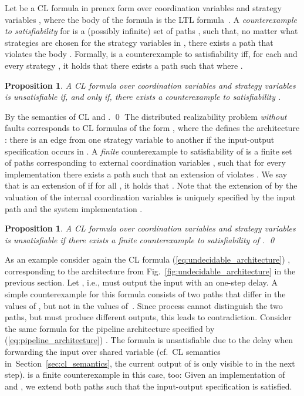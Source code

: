 \documentclass{LMCS}
\theoremstyle{plain}\newtheorem{theorem}[thm]{Theorem}
\theoremstyle{plain}\newtheorem{lemma}[thm]{Lemma}
\theoremstyle{plain}\newtheorem{proposition}[thm]{Proposition}
\theoremstyle{plain}\newtheorem{corollary}[thm]{Corollary}
\theoremstyle{definition}\newtheorem{definition}{Definition}[section]
\begin{document}
Let  be a CL formula in prenex form over coordination variables  and strategy variables , where the body of the formula is the LTL formula~.
A \emph{counterexample to satisfiability} for  is a (possibly infinite) set of paths , such that, no matter what strategies are chosen for the strategy variables in , there exists a path  that violates the body .
Formally,  is a counterexample to satisfiability iff, for each  and every strategy , it holds that there exists a path  such that  where .
\begin{proposition} \label{eq:ecl_unsatisfiability}
A CL formula  over coordination variables  and strategy variables 
is unsatisfiable if, and only if, there exists a counterexample to satisfiability .
\end{proposition}
\proof
  By the semantics of CL and .
\qed\noindent
The distributed realizability problem \emph{without} faults corresponds to CL formulas of the form , where the  defines the architecture : there is an edge from one strategy variable to another if the input-output specification occurs in .
A \emph{finite} counterexample to satisfiability of  is a finite set of paths  corresponding to external coordination variables , such that for every implementation  there exists a path  such that an extension  of  violates .
We say that  is an extension of  if for all , it holds that .
Note that the extension of  by the valuation of the internal coordination variables is uniquely specified by the input path  and the system implementation .
\begin{proposition} \label{eq:dr_without_faults_finite_unsatisfiability}
  A CL formula  over coordination variables  and strategy variables  is unsatisfiable if there exists a finite counterexample to satisfiability  of . \qed
\end{proposition}\noindent
As an example consider again the CL formula (\ref{eq:undecidable_architecture}) ,
corresponding to the architecture from Fig.~\ref{fig:undecidable_architecture} in the previous section. Let , i.e.,  must output the input  with an one-step delay.
A simple counterexample for this formula consists of two paths  that differ in the values of , but not in the values of~. 
Since process  cannot distinguish the two paths, but must produce different outputs, this leads to contradiction.
Consider the same formula  for the pipeline architecture specified by (\ref{eq:pipeline_architecture}) .
The formula is unsatisfiable due to the delay when forwarding the input  over shared variable  (cf.\ CL semantics in~Section~\ref{sec:cl_semantics}, the current output of  is only visible to  in the next step).
 is a finite counterexample in this case, too: Given an implementation of  and , we extend both paths such that the input-output specification  is satisfied.
\end{document}
